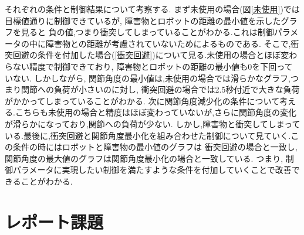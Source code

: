 \documentclass[a4paper,11pt,titlepage]{jsarticle}
\begin{document}
{それぞれの条件と制御結果について考察する.
まず未使用の場合(図\ref{未使用})では目標値通りに制御できているが, 障害物とロボットの距離の最小値を示したグラフを見ると
負の値,つまり衝突してしまっていることがわかる.これは制御パラメータの中に障害物との距離が考慮されていないためによるものである.
そこで,衝突回避の条件を付加した場合(\ref{衝突回避})について見る.未使用の場合とほぼ変わらない精度で制御できており, 障害物とロボットの距離の最小値も0を下回っていない.
しかしながら, 関節角度の最小値は,未使用の場合では滑らかなグラフ,つまり関節への負荷が小さいのに対し, 衝突回避の場合では2.5秒付近で大きな負荷がかかってしまっていることがわかる.
次に関節角度減少化の条件について考える.こちらも未使用の場合と精度はほぼ変わっていないが,さらに関節角度の変化が滑らかになっており,関節への負荷が少ない.
しかし,障害物と衝突してしまっている.最後に,衝突回避と関節角度最小化を組み合わせた制御について見ていく.この条件の時にはロボットと障害物の最小値のグラフは
衝突回避の場合と一致し, 関節角度の最大値のグラフは関節角度最小化の場合と一致している.
つまり, 制御パラメータに実現したい制御を満たすような条件を付加していくことで改善できることがわかる.

\section{レポート課題}
}
\end{document}
